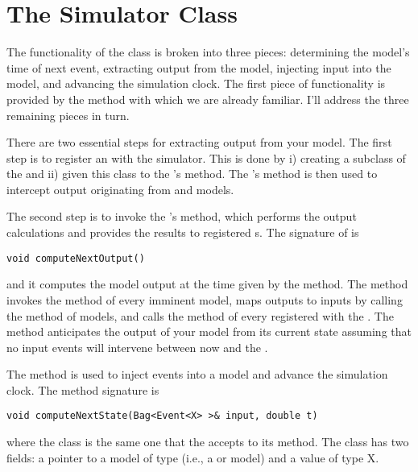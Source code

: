 \chapter{The Simulator Class}
The functionality of the  class is broken into three pieces: determining the model's time of next event, extracting output from the model, injecting input into the model, and advancing the simulation clock. The first piece of functionality is provided by the  method with which we are already familiar. I'll address the three remaining pieces in turn. 

There are two essential steps for extracting output from your model. The first step is to register an  with the simulator. This is done by i) creating a subclass of the  and ii) given this class to the 's  method. The 's  method is then used to intercept output originating from  and  models.

The second step is to invoke the 's  method, which performs the output calculations and provides the results to registered s. The signature of  is
\begin{verbatim}
void computeNextOutput()
\end{verbatim}
and it computes the model output at the time given by the  method. The  method invokes the  method of every imminent  model, maps outputs to inputs by calling the  method of  models, and calls the  method of every  registered with the . The  method anticipates the output of your model from its current state assuming that no input events will intervene between now and the .

The  method is used to inject events into a model and advance the simulation clock. The method signature is
\begin{verbatim}
void computeNextState(Bag<Event<X> >& input, double t)
\end{verbatim}
where the  class is the same one that the  accepts to its  method. The  class has two fields: a pointer to a model of type  (i.e., a  or  model) and a value of type X. 

